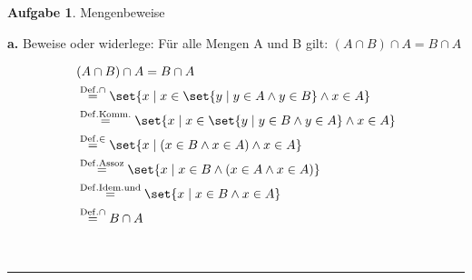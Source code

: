 \documentclass[10pt,leqno ]{article}
\DeclarePairedDelimiter\set\{\}
\theoremstyle{definition}
\newtheorem{problem}[theorem]{Aufgabe}
\newenvironment{solution}[1][L]{\begin{doublespace}\textbf{#1.}\quad }{\ \rule{0.5em}{0.5em}\end{doublespace}}
\begin{document}
\begin{problem}
Mengenbeweise
\end{problem}

\begin{solution}[a]
Beweise oder widerlege: Für alle Mengen A und B gilt: \( (A \cap B) \cap A = B \cap A \)

\begin{align*}
    & (A \cap B) \cap A = B \cap A \\
    & \overset{\mathrm{Def. \cap}}{=} \set{x \mid x \in \set{y \mid y \in A \land y \in B} \land x \in A} \\
    & \overset{\mathrm{Def. Komm.}}{=} \set{x \mid x \in \set{y \mid y \in B \land y \in A} \land x \in A} \\
    & \overset{\mathrm{Def. \in}}{=} \set{x \mid (x \in B \land x \in A) \land x \in A} \\
    & \overset{\mathrm{Def. Assoz}}{=} \set{x \mid x \in B \land (x \in A \land x \in A)} \\
    & \overset{\mathrm{Def. Idem. und}}{=} \set{x \mid x \in B \land x \in A} \\
    & \overset{\mathrm{Def. \cap}}{=} B \cap A \\
\end{align*}

\end{solution}
\end{document}
